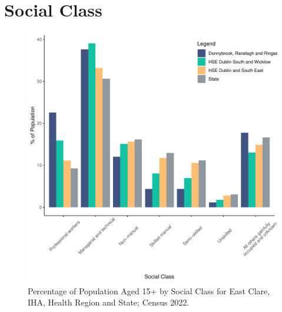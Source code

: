 \documentclass{article}
\begin{document}
\section{Social Class}\label{sect:SC}
\begin{figure}[H]
	\centering
	\includegraphics[width = 140mm]{../figures/SocialClassED.pdf}
	\caption{Percentage of Population Aged 15+ by Social Class for East Clare, IHA, Health Region and State; Census 2022.}
	\label{fig:vbnv}
	\end{figure}
\end{document}
